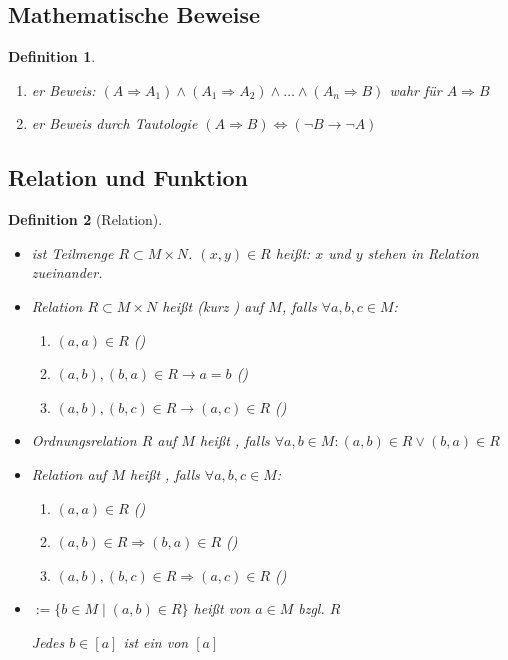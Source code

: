 \documentclass[ngerman,a4paper]{report}
\theoremstyle{break}
\newtheorem*{definition}{Definition}
\newcommand{\highlight}[1]{\emph{#1}}
\begin{document}
\subsection*{Mathematische Beweise}
\begin{definition}
	\begin{enumerate}
		\item {}\highlight{er Beweis}: $(A\Rightarrow A_1)\land(A_1\Rightarrow A_2)\land\dotsc\land(A_n\Rightarrow B)$ wahr für $A\Rightarrow B$
		\item {}\highlight{er Beweis} durch Tautologie $(A\Rightarrow B)\Leftrightarrow (\neg B\rightarrow \neg A)$
	\end{enumerate}
\end{definition}

\subsection*{Relation und Funktion}
\begin{definition}[Relation]
	\begin{itemize}
		\item {} ist Teilmenge $R\subset M\times N$. $(x,y)\in R$ heißt: $x$ und $y$ stehen in Relation zueinander.
		\item Relation $R\subset M\times N$ heißt  (kurz ) auf $M$, falls $\forall a,b,c\in M$:
		\begin{enumerate}[label={\alph*)}]
			\item $(a,a)\in R$ ()
			\item $(a,b),(b,a)\in R \rightarrow a=b$ ()
			\item $(a,b),(b,c)\in R \rightarrow (a,c)\in R$ ()
		\end{enumerate}
		\item Ordnungsrelation $R$ auf $M$ heißt , falls $\forall a,b\in M: (a,b)\in R \lor (b,a)\in R$
		\item Relation auf $M$ heißt , falls $\forall a,b,c\in M$:
		\begin{enumerate}[label={\alph*)}]
			\item $(a,a)\in R$ ()
			\item $(a,b)\in R \Rightarrow (b,a)\in R$ ()
			\item $(a,b),(b,c)\in R \Rightarrow (a,c)\in R$ ()
		\end{enumerate}
		\item \mathsymbol{[a]}{$[a]$}$:=\{b\in M\mid (a,b)\in R\}$ heißt  von $a\in M$ bzgl. $R$
		
		Jedes $b\in [a]$ ist ein  von $[a]$
	\end{itemize}
\end{definition}
\end{document}
